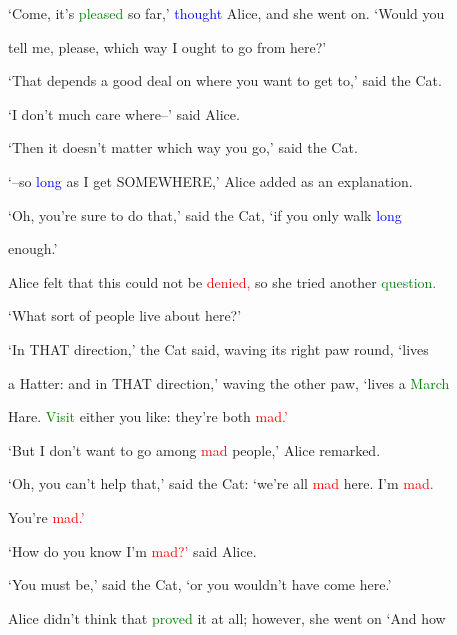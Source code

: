  ‘Come, it’s \textcolor{green}{pleased} so far,’ \textcolor{blue}{thought} Alice, and she went on. ‘Would you

 tell me, please, which way I ought to go from here?’



 ‘That depends a \textcolor{BurntOrange}{good} \textcolor{BurntOrange}{deal} on where you want to get to,’ said the Cat.



 ‘I don’t much care where--’ said Alice.



 ‘Then it doesn’t matter which way you go,’ said the Cat.



 ‘--so \textcolor{blue}{long} as I get SOMEWHERE,’ Alice added as an explanation.



 ‘Oh, you’re sure to do that,’ said the Cat, ‘if you only walk \textcolor{blue}{long}

 enough.’



 Alice felt that this could not be \textcolor{red}{denied,} so she tried another \textcolor{green}{question.}

 ‘What sort of people live about here?’



 ‘In THAT direction,’ the Cat said, waving its right paw round, ‘lives

 a Hatter: and in THAT direction,’ waving the other paw, ‘lives a \textcolor{green}{March}

 Hare. \textcolor{green}{Visit} either you like: they’re both \textcolor{red}{mad.’}



 ‘But I don’t want to go among \textcolor{red}{mad} people,’ Alice remarked.



 ‘Oh, you can’t help that,’ said the Cat: ‘we’re all \textcolor{red}{mad} here. I’m \textcolor{red}{mad.}

 You’re \textcolor{red}{mad.’}



 ‘How do you know I’m \textcolor{red}{mad?’} said Alice.



 ‘You must be,’ said the Cat, ‘or you wouldn’t have come here.’



 Alice didn’t think that \textcolor{green}{proved} it at all; however, she went on ‘And how

